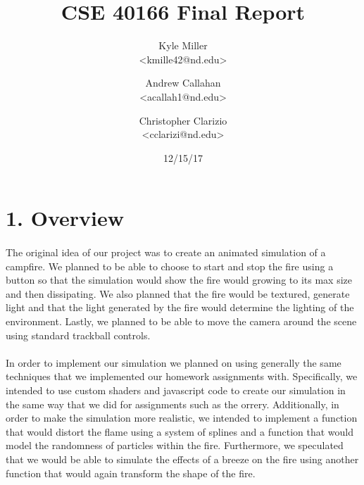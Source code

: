 \documentclass[letterpaper]{article}
\begin{document}

\title{CSE 40166 Final Report}
\date{12/15/17}
\author{Kyle Miller\\ {\textless}kmille42@nd.edu{\textgreater} \and Andrew Callahan\\ {\textless}acallah1@nd.edu{\textgreater} \and Christopher Clarizio\\ {\textless}cclarizi@nd.edu{\textgreater}}

\maketitle


\section*{1. Overview}

\paragraph{}
	The original idea of our project was to create an animated simulation of a campfire. We planned to be able to choose to start and stop the fire using a button so that the simulation would show the fire would growing to its max size and then dissipating. We also planned that the fire would be textured, generate light and that the light generated by the fire would determine the lighting of the environment. Lastly, we planned to be able to move the camera around the scene using standard trackball controls.
\paragraph{}
    In order to implement our simulation we planned on using generally the same techniques that we implemented our homework assignments with. Specifically, we intended to use custom shaders and javascript code to create our simulation in the same way that we did for assignments such as the orrery. Additionally, in order to make the simulation more realistic, we intended to implement a function that would distort the flame using a system of splines and a function that would model the randomness of particles within the fire. Furthermore, we speculated that we would be able to simulate the effects of a breeze on the fire using another function that would again transform the shape of the fire.
\end{document}
